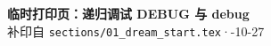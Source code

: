 \documentclass{article}
\begin{document}
	\begin{center}
		{\Large \textbf{临时打印页：递归调试 DEBUG 与 debug}} \\[4pt]
		{\small 补印自 \texttt{sections/01\_dream\_start.tex}\quad·-10-27}
	\end{center}

	\vspace{0.5em}

	
\end{document}
